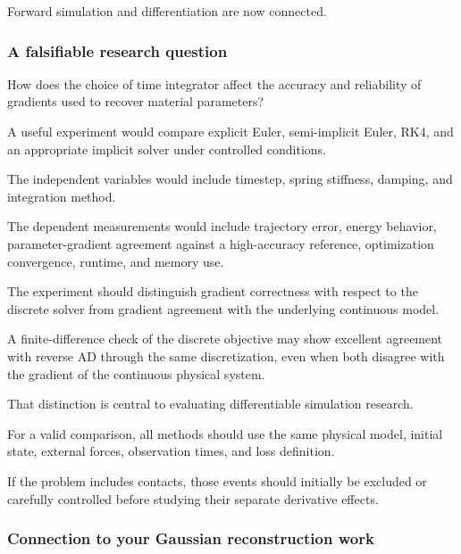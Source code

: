 Forward simulation and differentiation are now connected.

\subsubsection{A falsifiable research question}\label{02-foundations-ii-ch022-a-falsifiable-research-question}

\hypertarget{02-foundations-ii-ch022-a-falsifiable-research-question}{}

How does the choice of time integrator affect the accuracy and reliability of gradients used to recover material parameters?

A useful experiment would compare explicit Euler, semi-implicit Euler, RK4, and an appropriate implicit solver under controlled conditions.

The independent variables would include timestep, spring stiffness, damping, and integration method.

The dependent measurements would include trajectory error, energy behavior, parameter-gradient agreement against a high-accuracy reference, optimization convergence, runtime, and memory use.

The experiment should distinguish gradient correctness with respect to the discrete solver from gradient agreement with the underlying continuous model.

A finite-difference check of the discrete objective may show excellent agreement with reverse AD through the same discretization, even when both disagree with the gradient of the continuous physical system.

That distinction is central to evaluating differentiable simulation research.

For a valid comparison, all methods should use the same physical model, initial state, external forces, observation times, and loss definition.

If the problem includes contacts, those events should initially be excluded or carefully controlled before studying their separate derivative effects.

\subsubsection{Connection to your Gaussian reconstruction work}\label{02-foundations-ii-ch022-connection-to-your-gaussian-reconstruction-work}

\hypertarget{02-foundations-ii-ch022-connection-to-your-gaussian-reconstruction-work}{}

